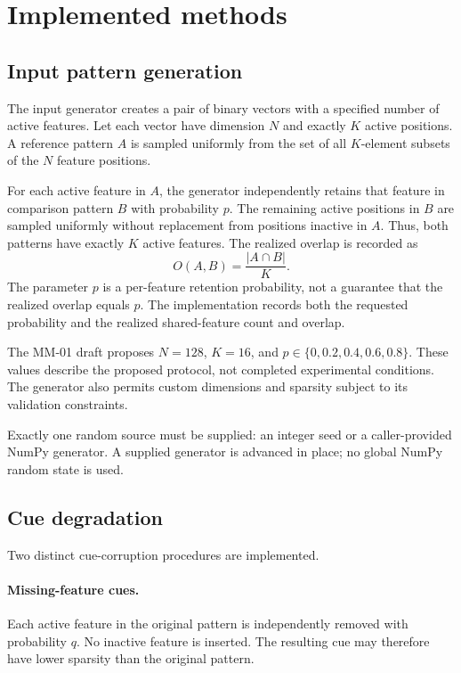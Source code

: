 \documentclass[11pt,a4paper]{article}
\begin{document}
\section{Implemented methods}

\subsection{Input pattern generation}

The input generator creates a pair of binary vectors with a specified number of active features. Let each vector have dimension $N$ and exactly $K$ active positions. A reference pattern $A$ is sampled uniformly from the set of all $K$-element subsets of the $N$ feature positions.

For each active feature in $A$, the generator independently retains that feature in comparison pattern $B$ with probability $p$. The remaining active positions in $B$ are sampled uniformly without replacement from positions inactive in $A$. Thus, both patterns have exactly $K$ active features. The realized overlap is recorded as
\[
O(A,B)=\frac{|A\cap B|}{K}.
\]
The parameter $p$ is a per-feature retention probability, not a guarantee that the realized overlap equals $p$. The implementation records both the requested probability and the realized shared-feature count and overlap.

The MM-01 draft proposes $N=128$, $K=16$, and $p\in\{0,0.2,0.4,0.6,0.8\}$. These values describe the proposed protocol, not completed experimental conditions. The generator also permits custom dimensions and sparsity subject to its validation constraints.

Exactly one random source must be supplied: an integer seed or a caller-provided NumPy generator. A supplied generator is advanced in place; no global NumPy random state is used.

\subsection{Cue degradation}

Two distinct cue-corruption procedures are implemented.

\paragraph{Missing-feature cues.}
Each active feature in the original pattern is independently removed with probability $q$. No inactive feature is inserted. The resulting cue may therefore have lower sparsity than the original pattern.
\end{document}
